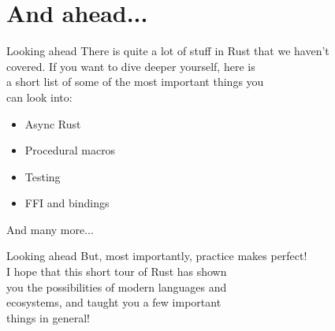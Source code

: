 \documentclass[usenames,dvipsnames,10pt,aspectratio=169]{beamer}
\begin{document}
\section{And ahead...}

\begin{frame}{Looking ahead}
	\large
There is quite a lot of stuff in Rust that we haven't\\
covered. If you want to dive deeper yourself, here is\\
a short list of some of the most important things you\\
can look into:
\vspace{0.2cm}
\begin{itemize}[label=$\bullet$]
	\item Async Rust
	\item Procedural macros
	\item Testing
	\item FFI and bindings
\end{itemize}
\vspace{0.2cm}
And many more...
\end{frame}

\begin{frame}{Looking ahead}
\Large
But, most importantly, practice makes perfect!\\

\vspace{0.4cm}
I hope that this short tour of Rust has shown\\
you the possibilities of modern languages and\\
ecosystems, and taught you a few important\\
things in general!
\end{frame}

\end{document}
